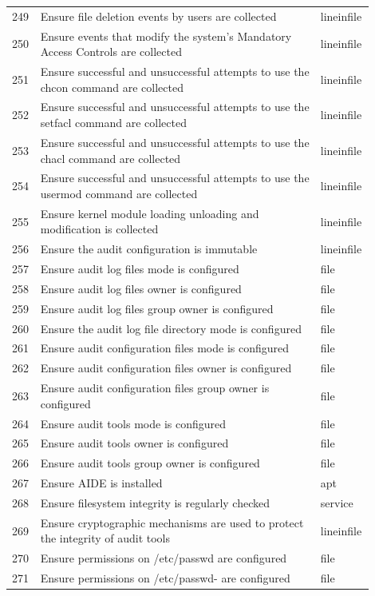 \begin{longtable}{|p{0.05\linewidth}|p{0.75\linewidth}|p{0.1\linewidth}|}
249 & Ensure file deletion events by users are collected & lineinfile \\
250 & Ensure events that modify the system's Mandatory Access Controls are collected & lineinfile \\
251 & Ensure successful and unsuccessful attempts to use the chcon command are collected & lineinfile \\
252 & Ensure successful and unsuccessful attempts to use the setfacl command are collected & lineinfile \\
253 & Ensure successful and unsuccessful attempts to use the chacl command are collected & lineinfile \\
254 & Ensure successful and unsuccessful attempts to use the usermod command are collected & lineinfile \\
255 & Ensure kernel module loading unloading and modification is collected & lineinfile \\
256 & Ensure the audit configuration is immutable & lineinfile \\
257 & Ensure audit log files mode is configured & file \\
258 & Ensure audit log files owner is configured & file \\
259 & Ensure audit log files group owner is configured & file \\
260 & Ensure the audit log file directory mode is configured & file \\
261 & Ensure audit configuration files mode is configured & file \\
262 & Ensure audit configuration files owner is configured & file \\
263 & Ensure audit configuration files group owner is configured & file \\
264 & Ensure audit tools mode is configured & file \\
265 & Ensure audit tools owner is configured & file \\
266 & Ensure audit tools group owner is configured & file \\
267 & Ensure AIDE is installed & apt \\
268 & Ensure filesystem integrity is regularly checked & service \\
269 & Ensure cryptographic mechanisms are used to protect the integrity of audit tools & lineinfile \\
270 & Ensure permissions on /etc/passwd are configured & file \\
271 & Ensure permissions on /etc/passwd- are configured & file \\

\end{longtable}
